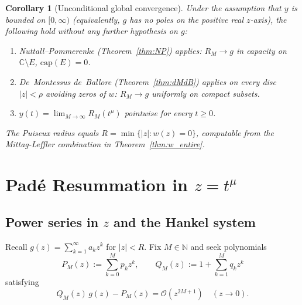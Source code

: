 \documentclass[12pt,a4paper]{amsart}
\newcommand{\assign}{:=}
\theoremstyle{plain}
\newtheorem{corollary}[theorem]{Corollary}
\theoremstyle{definition}
\theoremstyle{remark}
\begin{document}
\begin{corollary}[Unconditional global convergence]\label{cor:global}
Under the assumption that $y$ is bounded on $[0,\infty)$ (equivalently, $g$
has no poles on the positive real $z$-axis), the following hold without
any further hypothesis on $g$:
\begin{enumerate}[label=(\roman*)]
\item Nuttall--Pommerenke (Theorem~\ref{thm:NP}) applies: $R_M\to g$ in
capacity on $\mathbb{C}\setminus E$, $\mathrm{cap}(E)=0$.
\item De~Montessus de~Ballore (Theorem~\ref{thm:dMdB}) applies on every disc
$|z|<\rho$ avoiding zeros of $w$: $R_M\to g$ uniformly on compact subsets.
\item $y(t)=\lim_{M\to\infty}R_M(t^{\mu})$ pointwise for every $t\ge 0$.
\end{enumerate}
The Puiseux radius equals $R=\min\{|z|:w(z)=0\}$, computable from the
Mittag-Leffler combination in Theorem~\ref{thm:w_entire}.
\end{corollary}

\section{Pad\'e Resummation in $z=t^{\mu}$}\label{sec:pade}

\subsection{Power series in $z$ and the Hankel system}

Recall $g(z)=\sum_{k=1}^{\infty}a_k z^k$ for $|z|<R$.
Fix $M\in\mathbb{N}$ and seek polynomials
\[
  P_M(z)\assign\sum_{k=0}^M p_k z^k,\qquad
  Q_M(z)\assign 1+\sum_{k=1}^M q_k z^k
\]
satisfying
\begin{equation}\label{eq:Pade_match}
  Q_M(z)\,g(z)-P_M(z) = \mathcal{O}(z^{2M+1})\quad(z\to 0).
\end{equation}
\end{document}

